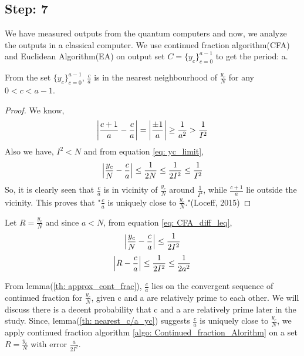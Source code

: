 \subsection{Step: 7} \label{sub: step7}
We have measured outputs from the quantum computers and now, we analyze the outputs in a classical computer. We use continued fraction algorithm(CFA) and Euclidean Algorithm(EA) on output set $C=\{y_c\}_{c=0}^{a-1}$ to get the period: a. 
\begin{lemma}
    From the set $\{y_c\}_{c=0}^{a-1}$, $\frac{c}{a}$ is in the nearest neighbourhood of $\frac{y_c}{N}$ for any $0<c<a-1$.
    \label{th: nearest_c/a_yc}
\end{lemma}
\begin{proof}
    We know,\begin{equation*}
        \abs{\frac{c+1}{a} -\frac{c}{a}} = \abs{\frac{\pm 1}{a}} \geq \frac{1}{a^2} > \frac{1}{I^2}
    \end{equation*}
    Also we have, $I^2<N$ and from equation \ref{eq: yc_limit},
    \begin{equation}
        \abs{\frac{y_c}{N} -\frac{c}{a}} \leq \frac{1}{2N} \leq \frac{1}{2I^2} \leq \frac{1}{I^2}
        \label{eq: CFA_diff_leq}
    \end{equation}
    So, it is clearly seen that $\frac{c}{a}$ is in vicinity of $\frac{y_c}{N}$ around $\frac{1}{I^2}$, while $\frac{c+1}{a}$ lie outside the vicinity. This proves that "$\frac{c}{a}$ is uniquely close to $\frac{y_c}{N}$."(Loceff, 2015)\cite{loceff2015}
\end{proof}

Let $R= \frac{y_c}{N}$ and since $a<N$, from equation \ref{eq: CFA_diff_leq},
\begin{equation*}
    \abs{\frac{y_c}{N} -\frac{c}{a}} \leq \frac{1}{2I^2}
\end{equation*}
\begin{equation}
    \abs{R -\frac{c}{a}} \leq \frac{1}{2I^2} \leq \frac{1}{2a^2}
    \label{eq: CFA_diff_leq_a2 }
\end{equation}

From lemma(\ref{th: approx_cont_frac}), $\frac{c}{a}$ lies on the convergent sequence of continued fraction for $\frac{y_c}{N}$, given c and a are relatively prime to each other. We will discuss there is a decent probability that c and a are relatively prime later in the study. Since, lemma(\ref{th: nearest_c/a_yc}) suggests $\frac{c}{a}$ is uniquely close to $\frac{y_c}{N}$,  we apply continued fraction algorithm \ref{algo: Continued_fraction_Alorithm} on a set $R= \frac{y_c}{N}$ with error $\frac{a}{2I^2}$.


